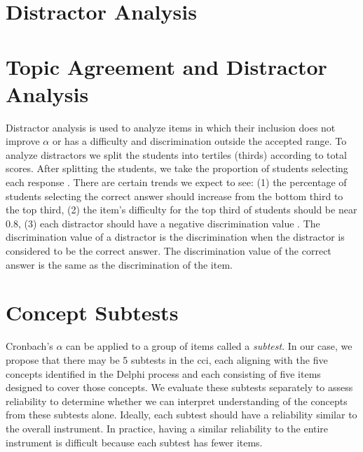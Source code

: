 \iflong
\section{Distractor Analysis}
\fi
\ifshort
\section{Topic Agreement and Distractor Analysis}
\fi


Distractor analysis is used to analyze items in which their inclusion does not improve $\alpha$ or has a difficulty and discrimination outside the accepted range. To analyze distractors we split the students into tertiles (thirds) according to total scores. After splitting the students, we take the proportion of students selecting each response \cite{og_ctt}. There are certain trends we expect to see: (1) the percentage of students selecting the correct answer should increase from the bottom third to the top third, (2) the item's difficulty for the top third of students should be near 0.8, (3) each distractor should have a negative discrimination value \cite{distractor}. The discrimination value of a distractor is the discrimination when the distractor is considered to be the correct answer. The discrimination value of the correct answer is the same as the discrimination of the item.
     
\section{Concept Subtests}     
     
Cronbach's $\alpha$ can be applied to a group of items called a \textit{subtest}. In our case, we propose that there may be 5 subtests in the \gls{cci}, each aligning with the five concepts identified in the Delphi process and each consisting of five items designed to cover those concepts. We evaluate these subtests separately to assess reliability to determine whether we can interpret understanding of the concepts from these subtests alone. Ideally, each subtest should have a reliability similar to the overall instrument. In practice, having a similar reliability to the entire instrument is difficult because each subtest has fewer items.
